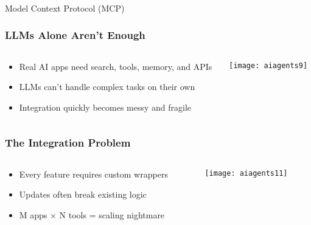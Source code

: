 \begin{frame}[fragile]\frametitle{}
\begin{center}
{\Large Model Context Protocol (MCP)}
\end{center}
\end{frame}

\begin{frame}[fragile]\frametitle{LLMs Alone Aren't Enough}

\begin{columns}
    \begin{column}[T]{0.5\linewidth}
      \begin{itemize}
        \item Real AI apps need search, tools, memory, and APIs
        \item LLMs can't handle complex tasks on their own
        \item Integration quickly becomes messy and fragile
      \end{itemize}

    \end{column}
    \begin{column}[T]{0.5\linewidth}
		\begin{center}
		\texttt{[image: aiagents9]}
		\end{center}
    \end{column}
  \end{columns}
   
\end{frame}


\begin{frame}[fragile]\frametitle{The Integration Problem}

\begin{columns}
    \begin{column}[T]{0.5\linewidth}
      \begin{itemize}
        \item Every feature requires custom wrappers
        \item Updates often break existing logic
        \item M apps $\times$ N tools = scaling nightmare
      \end{itemize}

    \end{column}
    \begin{column}[T]{0.5\linewidth}
		\begin{center}
		\texttt{[image: aiagents11]}
		\end{center}
    \end{column}
  \end{columns}
  
\end{frame}

